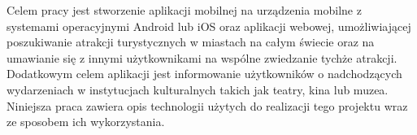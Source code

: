 Celem pracy jest stworzenie aplikacji mobilnej na urządzenia mobilne z systemami operacyjnymi Android lub iOS oraz aplikacji webowej, umożliwiającej poszukiwanie atrakcji turystycznych w miastach na całym świecie oraz na umawianie się z innymi użytkownikami na wspólne zwiedzanie tychże atrakcji. \\
Dodatkowym celem aplikacji jest informowanie użytkowników o nadchodzących wydarzeniach w instytucjach kulturalnych takich jak teatry, kina lub muzea. \\
Niniejsza praca zawiera opis technologii użytych do realizacji tego projektu wraz ze sposobem ich wykorzystania.
